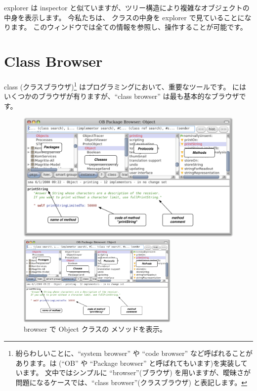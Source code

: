 \documentclass[a4paper,10pt,twoside]{book}
\begin{document}
{explorer は inspector と似ていますが、ツリー構造により複雑なオブジェクトの中身を表示します。
今私たちは、 クラスの中身を explorer で見ていることになります。
このウィンドウでは全ての情報を参照し、操作することが可能です。

\section{Class Browser}

class (クラスブラウザ)\footnote{
紛らわしいことに、``system browser'' や ``code browser'' など呼ばれることがあります。\pharo は  (``OB'' や ``Package browser'' と呼ばれてもいます)を実装しています。
文中ではシンプルに ``browser''(ブラウザ) を用いますが、曖昧さが問題になるケースでは、``class browser''(クラスブラウザ) と表記します。} はプログラミングにおいて、重要なツールです。
\pharo にはいくつかのブラウザが有りますが、``class browser'' は最も基本的なブラウザです。



\begin{figure}[htb]
\ifluluelse
	{\centerline {\includegraphics[width=\textwidth]{ClassBrowser1}}}
	{\centerline {\includegraphics[width=0.7\textwidth]{ClassBrowser1}}}
\caption{browser で Object クラスの  メソッドを表示。
}
\end{figure}

}
\end{document}
